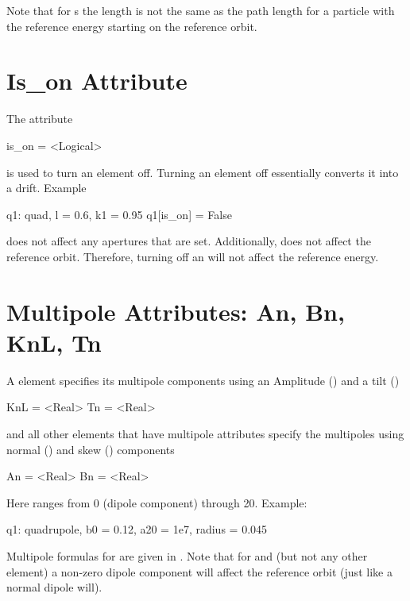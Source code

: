 Note that for s
the length  is not the same as the path length for a particle
with the reference energy starting on the reference orbit.

\section{Is_on Attribute}
\label{s:is.on}

The  attribute
\begin{example}
  is_on = <Logical>
\end{example}
is used to turn an element off. Turning
an element off essentially converts it into a drift.
Example
\begin{example}
  q1: quad, l = 0.6, k1 = 0.95
  q1[is_on] = False
\end{example}

 does not affect any apertures that are set. Additionally,
 does not affect the reference orbit. Therefore, turning 
off an  will not affect the reference energy.

\section{Multipole Attributes: An, Bn, KnL, Tn}
\label{s:multip}

A  element specifies its multipole components using an
Amplitude () and a tilt ()
\begin{example}
  KnL = <Real>
  Tn  = <Real>
\end{example}
 and all other elements that
have multipole attributes specify the multipoles using normal
() and skew () components 
\begin{example}
  An = <Real>
  Bn = <Real>
\end{example}
Here  ranges from 0
(dipole component) through 20. Example:
\begin{example}
  q1: quadrupole, b0 = 0.12, a20 = 1e7, radius = 0.045
\end{example}

Multipole formulas for are given in .  Note that for
 and  (but not any other element) a
non-zero dipole component will affect the reference orbit (just like a
normal dipole will).


